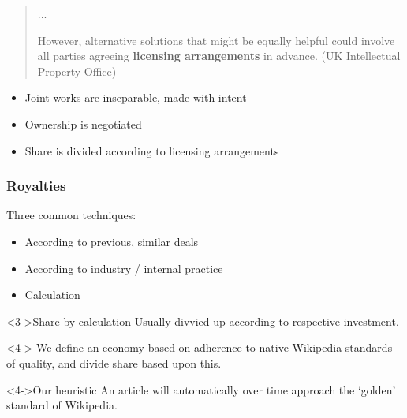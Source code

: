 \documentclass[t]{beamer}
\begin{document}
\begin{frame}[shrink]
{\begin{quote}
        ...

        However, alternative solutions that might be equally helpful
        could involve all parties agreeing \textbf{licensing
          arrangements} in advance. (UK Intellectual Property Office)
        \cite{joint-authorship}
      \end{quote}

    }

    \begin{itemize}[<+->]
      \item Joint works are inseparable, made with intent
      \item Ownership is negotiated
      \item Share is divided according to licensing arrangements
    \end{itemize}
  \end{frame}



  \begin{frame}

    \frametitle{Royalties}
    Three common techniques: \cite{simplemethod}
    \begin{itemize}
      \item<1->{According to previous, similar deals}
      \item<2->{According to industry / internal practice}
      \item<3-> \alert{Calculation}
    \end{itemize}

    \begin{alertblock}<3->{Share by calculation}
        Usually divvied up according to respective investment.
      \end{alertblock}
    
    \begin{block}<4->{}
      We define an economy based on adherence to native Wikipedia
      standards of quality, and divide share based upon this.
    \end{block}
    \begin{exampleblock}<4->{Our heuristic}
      An article will automatically over time approach the `golden'
      standard of Wikipedia.
    \end{exampleblock}

  \end{frame}


\end{document}
